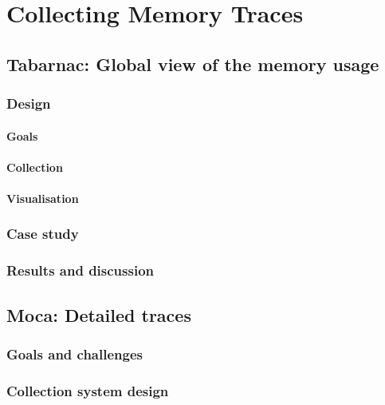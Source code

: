 \chapter{Collecting Memory Traces}

\section{Tabarnac: Global view of the memory usage}


\subsection{Design}

\subsubsection{Goals}

\subsubsection{Collection}

\subsubsection{Visualisation}

\subsection{Case study}

\subsection{Results and discussion}


\section{Moca: Detailed traces}

\subsection{Goals and challenges}

\subsection{Collection system design}

